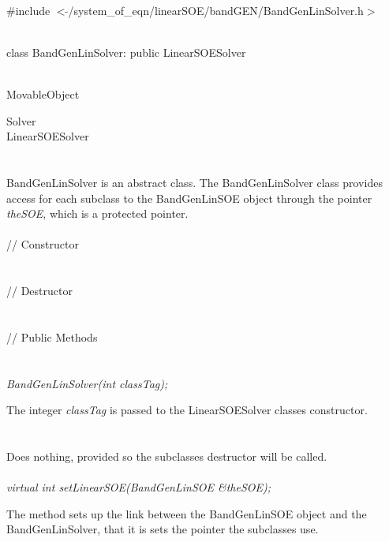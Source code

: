 
   \\
\#include $<\tilde{ }$/system\_of\_eqn/linearSOE/bandGEN/BandGenLinSolver.h$>$  


  \\
class BandGenLinSolver: public LinearSOESolver  


 \\
MovableObject 

\indent\indent  Solver \\
\indent\indent\indent LinearSOESolver \\
\indent\indent\indent{} \\

  \\
\indent BandGenLinSolver is an abstract class.  The BandGenLinSolver
class provides access for each subclass to the BandGenLinSOE object
through the pointer {\em theSOE}, which is a protected pointer. \\


  \\
\indent\indent // Constructor \\
\indent{}  \\ \\
\indent\indent // Destructor \\
\indent{}\\  \\
\indent\indent // Public Methods \\
\indent{} \\

  \\
{\em BandGenLinSolver(int classTag);}  

The integer {\em classTag} is passed to the LinearSOESolver classes
constructor. \\ 

 \\
\\ 
Does nothing, provided so the subclasses destructor will be called. \\

  \\
{\em virtual int setLinearSOE(BandGenLinSOE \&theSOE);} 

The method sets up the link between the BandGenLinSOE object and the
BandGenLinSolver, that it is sets the pointer the subclasses use.  \\




